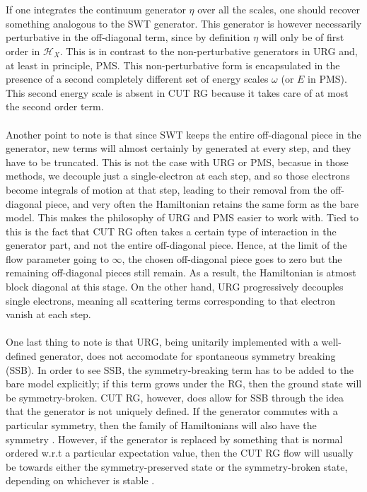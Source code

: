 \documentclass[twoside]{report}
\numberwithin{equation}{section}
\begin{document}
\\\\If one integrates the continuum generator \(\eta\) over all the scales, one should recover something analogous to the SWT generator. This generator is however necessarily perturbative in the off-diagonal term, since by definition \(\eta\) will only be of first order in \(\mathcal{H}_X\). This is in contrast to the non-perturbative generators in URG and, at least in principle, PMS. This non-perturbative form is encapsulated in the presence of a second completely different set of energy scales \(\omega\) (or \(E\) in PMS). This second energy scale is absent in CUT RG because it takes care of at most the second order term.
\\\\Another point to note is that since SWT keeps the entire off-diagonal piece in the generator, new terms will almost certainly by generated at every step, and they have to be truncated. This is not the case with URG or PMS, becasue in those methods, we decouple just a single-electron at each step, and so those electrons become integrals of motion at that step, leading to their removal from the off-diagonal piece, and very often the Hamiltonian retains the same form as the bare model. This makes the philosophy of URG and PMS easier to work with. Tied to this is the fact that CUT RG often takes a certain type of interaction in the generator part, and not the entire off-diagonal piece. Hence, at the limit of the flow parameter going to \(\infty\), the chosen off-diagonal piece goes to zero but the remaining off-diagonal pieces still remain. As a result, the Hamiltonian is atmost block diagonal at this stage. On the other hand, URG progressively decouples single electrons, meaning all scattering terms corresponding to that electron vanish at each step. 
\\\\One last thing to note is that URG, being unitarily implemented with a well-defined generator, does not accomodate for spontaneous symmetry breaking (SSB). In order to see SSB, the symmetry-breaking term has to be added to the bare model explicitly; if this term grows under the RG, then the ground state will be symmetry-broken. CUT RG, however, does allow for SSB through the idea that the generator is not uniquely defined. If the generator commutes with a particular symmetry, then the family of Hamiltonians will also have the symmetry \cite{kehrein}. However, if the generator is replaced by something that is normal ordered w.r.t a particular expectation value, then the CUT RG flow will usually be towards either the symmetry-preserved state or the symmetry-broken state, depending on whichever is stable \cite{wegner_normal}.
\end{document}
